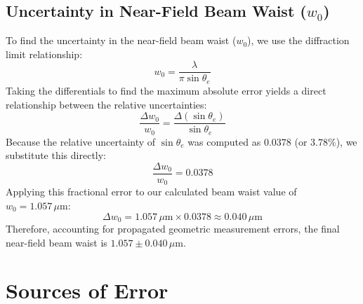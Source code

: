 \subsection{Uncertainty in Near-Field Beam Waist ($w_0$)}
To find the uncertainty in the near-field beam waist ($w_0$), we use the diffraction limit relationship:
\begin{equation}
    w_0 = \frac{\lambda}{\pi \sin\theta_e}
\end{equation}
Taking the differentials to find the maximum absolute error yields a direct relationship between the relative uncertainties:
\begin{equation}
    \frac{\Delta w_0}{w_0} = \frac{\Delta(\sin\theta_e)}{\sin\theta_e}
\end{equation}
Because the relative uncertainty of $\sin\theta_e$ was computed as $0.0378$ (or $3.78\%$), we substitute this directly:
\begin{equation}
    \frac{\Delta w_0}{w_0} = 0.0378
\end{equation}
Applying this fractional error to our calculated beam waist value of $w_0 = 1.057 \, \mu\mathrm{m}$:
\begin{equation}
    \Delta w_0 = 1.057 \, \mu\mathrm{m} \times 0.0378 \approx 0.040 \, \mu\mathrm{m}
\end{equation}
Therefore, accounting for propagated geometric measurement errors, the final near-field beam waist is $1.057 \pm 0.040 \, \mu\mathrm{m}$.


\section{Sources of Error}

